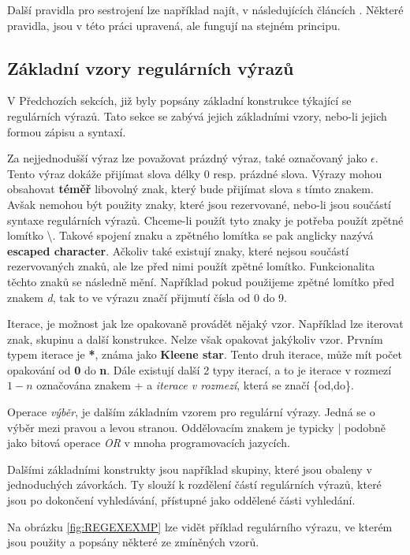 Další pravidla pro sestrojení lze například najít, v následujících článcích \cite{Thompson1,Thompson2}.
Některé pravidla, jsou v této práci upravená, ale fungují na stejném principu.

\subsection*{Základní vzory regulárních výrazů}
V Předchozích sekcích, již byly popsány základní konstrukce týkající se regulárních výrazů.
Tato sekce se zabývá jejich základními vzory, nebo-li jejich formou zápisu a syntaxí.

Za nejjednodušší výraz lze považovat prázdný výraz, také označovaný jako $\epsilon$. 
Tento výraz dokáže přijímat slova délky 0 resp. prázdné slova.
Výrazy mohou obsahovat \textbf{téměř} libovolný znak, který bude přijímat slova s tímto znakem. 
Avšak nemohou být použity znaky, které jsou rezervované, nebo-li jsou součástí syntaxe regulárních výrazů.
Chceme-li použít tyto znaky je potřeba použít zpětné lomítko \textbackslash. 
Takové spojení znaku a zpětného lomítka se pak anglicky nazývá \textbf{escaped character}.
Ačkoliv také existují znaky, které nejsou součástí rezervovaných znaků, ale lze před nimi použít zpětné lomítko.
Funkcionalita těchto znaků se následně mění. 
Například pokud použijeme zpětné lomítko před znakem \textit{d}, tak to ve výrazu značí přijmutí čísla od 0 do 9.

Iterace, je možnost jak lze opakovaně provádět nějaký vzor.
Například lze iterovat znak, skupinu a další konstrukce. 
Nelze však opakovat jakýkoliv vzor.
Prvním typem iterace je \textbf{*}, známa jako \textbf{Kleene star}.
Tento druh iterace, může mít počet opakování od \textbf{0} do \textbf{n}. 
Dále existují další 2 typy iterací, a to je iterace v rozmezí $1-n$ označována znakem + a \textit{iterace v rozmezí}, která se značí \{od,do\}.

Operace \textit{výběr}, je dalším základním vzorem pro regulární výrazy. 
Jedná se o výběr mezi pravou a levou stranou. 
Oddělovacím znakem je typicky | podobně jako bitová operace \textit{OR} v mnoha programovacích jazycích.

Dalšími základními konstrukty jsou například skupiny, které jsou obaleny v jednoduchých závorkách.
Ty slouží k rozdělení částí regulárních výrazů, které jsou po dokončení vyhledávání, přístupné jako oddělené části vyhledání.

Na obrázku \ref{fig:REGEXEXMP} lze vidět příklad regulárního výrazu, ve kterém jsou použity a popsány některé ze zmíněných vzorů.


